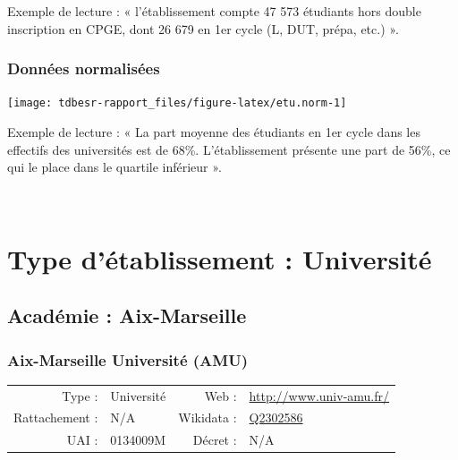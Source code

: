 \documentclass[12pt,french,]{article}
\begin{document}
Exemple de lecture : « l'établissement compte 47 573 étudiants hors
double inscription en CPGE, dont 26 679 en 1er cycle (L, DUT, prépa,
etc.) ».

\hypertarget{donnuxe9es-normalisuxe9es}{%
\subsubsection{Données normalisées}\label{donnuxe9es-normalisuxe9es}}

\begin{center}\texttt{[image: tdbesr-rapport\_files/figure-latex/etu.norm-1]} \end{center}

Exemple de lecture : « La part moyenne des étudiants en 1er cycle dans
les effectifs des universités est de 68\%. L'établissement présente une
part de 56\%, ce qui le place dans le quartile inférieur ».


\newpage
\footnotesize

\checkoddpage

\ifoddpage \fi ~\newpage  

\hypertarget{type-duxe9tablissement-universituxe9}{%
\section{Type d'établissement :
Université}\label{type-duxe9tablissement-universituxe9}}

\hypertarget{acaduxe9mie-aix-marseille}{%
\subsection{Académie : Aix-Marseille}\label{acaduxe9mie-aix-marseille}}

\hypertarget{aix-marseille-universituxe9-amu}{%
\subsubsection{Aix-Marseille Université
(AMU)}\label{aix-marseille-universituxe9-amu}}

\begin{tabular*}{\textwidth}{rp{5cm}rl}  
\hline  
Type : & Université & Web : &\href{http://www.univ-amu.fr/}{http://www.univ-amu.fr/} \\  
Rattachement : & N/A & Wikidata : & \href{https://www.wikidata.org/entity/Q2302586}{Q2302586} \\  
UAI : & 0134009M & Décret : & N/A \\  
\hline  
\end{tabular*}
\end{document}
